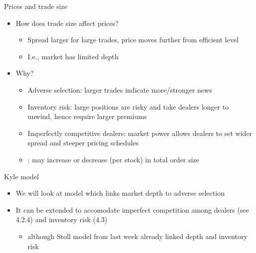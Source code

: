 \documentclass[english,10pt
,handout
]{beamer}
\begin{document}
\begin{frame}{Prices and trade size}
	\begin{itemize}
		\item How does trade size affect prices? 
		\begin{itemize}
			\item Spread larger for large trades, price moves further from efficient level
			\item I.e., market has limited depth
		\end{itemize}
		\item Why?
		\pause
		\begin{itemize}
			\item \alert{Adverse selection}: larger trades indicate more/stronger news
			\item \alert{Inventory risk}: large positions are risky and take dealers longer to unwind, hence require larger premiums
			\item \alert{Imperfectly competitive dealers}: market power allows dealers to set wider spread and steeper pricing schedules
			\pause
			\item {}: may increase or decrease (per stock) in total order size
		\end{itemize}
	\end{itemize}
\end{frame}


\begin{frame}{Kyle model}
	\begin{itemize}
		\item We will look at \cite{kyle_continuous_1985} model which links market depth to adverse selection
		\item It can be extended to accomodate imperfect competition among dealers (see 4.2.4) and inventory risk (4.3)
		\begin{itemize}
			\item although Stoll model from last week already linked depth and inventory risk
		\end{itemize}
	\end{itemize}
\end{frame}
\end{document}
